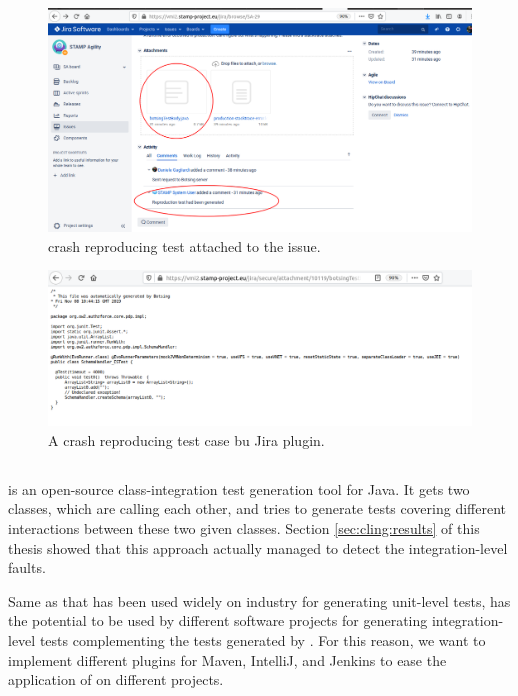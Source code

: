 \begin{figure}
    \includegraphics[width=\textwidth]{conclusion/figures/deliverables_wp4_d44_images_jira-reproduction-done.png}
    \caption{crash reproducing test attached to the issue.}
    \label{fig:conclusion:botsingJira3}
\end{figure}


\begin{figure}
    \includegraphics[width=\textwidth]{conclusion/figures/deliverables_wp4_d44_images_jira-generated-test-case.png}
    \caption{A crash reproducing test case bu \botsing Jira plugin.}
    \label{fig:conclusion:botsingJira4}
\end{figure}


\subsection{\cling}

\cling is an open-source class-integration test generation tool for Java. It gets two classes, which are calling each other, and tries to generate tests covering different interactions between these two given classes. Section \ref{sec:cling:results} of this thesis showed that this approach actually managed to detect the integration-level faults. 

Same as \evosuite that has been used widely on industry \cite{almasi2017industrial} for generating unit-level tests, \cling has the potential to be used by different software projects for generating integration-level tests complementing the tests generated by \evosuite. For this reason, we want to implement different plugins for Maven, IntelliJ, and Jenkins to ease the application of \cling on different projects.

